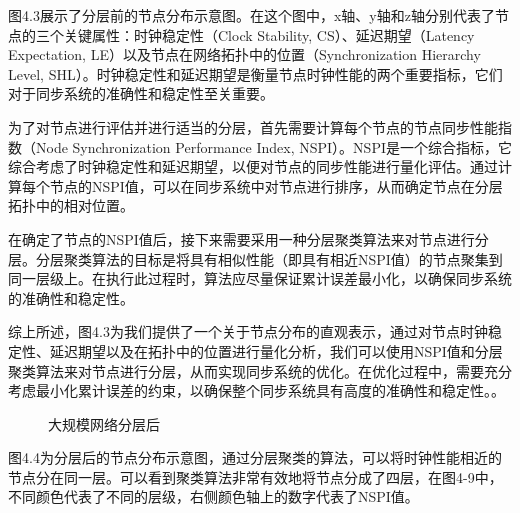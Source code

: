 \documentclass[UTF8,a4paper,12pt]{ctexart}
\numberwithin{equation}{section}
\begin{document}
图4.3展示了分层前的节点分布示意图。在这个图中，x轴、y轴和z轴分别代表了节点的三个关键属性：时钟稳定性（Clock Stability, CS）、延迟期望（Latency Expectation, LE）以及节点在网络拓扑中的位置（Synchronization Hierarchy Level, SHL）。时钟稳定性和延迟期望是衡量节点时钟性能的两个重要指标，它们对于同步系统的准确性和稳定性至关重要。

为了对节点进行评估并进行适当的分层，首先需要计算每个节点的节点同步性能指数（Node Synchronization Performance Index, NSPI）。NSPI是一个综合指标，它综合考虑了时钟稳定性和延迟期望，以便对节点的同步性能进行量化评估。通过计算每个节点的NSPI值，可以在同步系统中对节点进行排序，从而确定节点在分层拓扑中的相对位置。

在确定了节点的NSPI值后，接下来需要采用一种分层聚类算法来对节点进行分层。分层聚类算法的目标是将具有相似性能（即具有相近NSPI值）的节点聚集到同一层级上。在执行此过程时，算法应尽量保证累计误差最小化，以确保同步系统的准确性和稳定性。

综上所述，图4.3为我们提供了一个关于节点分布的直观表示，通过对节点时钟稳定性、延迟期望以及在拓扑中的位置进行量化分析，我们可以使用NSPI值和分层聚类算法来对节点进行分层，从而实现同步系统的优化。在优化过程中，需要充分考虑最小化累计误差的约束，以确保整个同步系统具有高度的准确性和稳定性。。
\begin{figure}[H] 
	\caption{大规模网络分层后}
\end{figure}

图4.4为分层后的节点分布示意图，通过分层聚类的算法，可以将时钟性能相近的节点分在同一层。可以看到聚类算法非常有效地将节点分成了四层，在图4-9中，不同颜色代表了不同的层级，右侧颜色轴上的数字代表了NSPI值。
\end{document}
